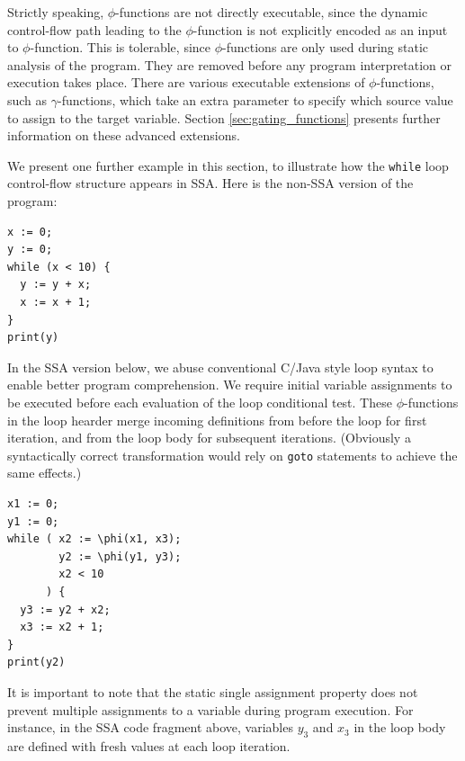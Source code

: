 Strictly speaking, $\phi$-functions are not directly executable,
since the dynamic control-flow path leading to the $\phi$-function
is not explicitly encoded as an input to $\phi$-function.
This is tolerable, since $\phi$-functions are only 
used during static analysis of the program. They are removed
before any program interpretation or execution takes place.
There are various executable extensions of $\phi$-functions, 
such as $\gamma$-functions, which take
an extra parameter to specify which source value to assign to the
target variable. 
Section \ref{sec:gating_functions}
presents further information on these advanced
extensions.



We present one further example in this section,
to illustrate how the \texttt{while} loop
control-flow structure appears in SSA.
Here is the non-SSA version of the program:

\begin{verbatim}
x := 0;
y := 0;
while (x < 10) {
  y := y + x;
  x := x + 1;
}
print(y)
\end{verbatim}

In the SSA version below,
we abuse conventional C/Java style loop syntax to 
enable better program comprehension.
We require initial variable assignments to be
executed before each evaluation of the loop 
conditional test.
These $\phi$-functions in the loop hearder
merge incoming definitions from before the loop
for first iteration,
and from the loop body for subsequent iterations.
(Obviously 
a syntactically correct transformation would rely on
\texttt{goto} statements to achieve the same effects.)

\begin{verbatim}
x1 := 0;
y1 := 0;
while ( x2 := \phi(x1, x3);
        y2 := \phi(y1, y3); 
        x2 < 10
      ) {
  y3 := y2 + x2;
  x3 := x2 + 1;
}
print(y2)
\end{verbatim}

It is important to note that the static single assignment 
property does not prevent multiple assignments to a variable
during program execution. For instance, in the SSA code fragment above,
variables $y_3$ and $x_3$ in the loop body are defined with fresh values 
at each loop iteration.


